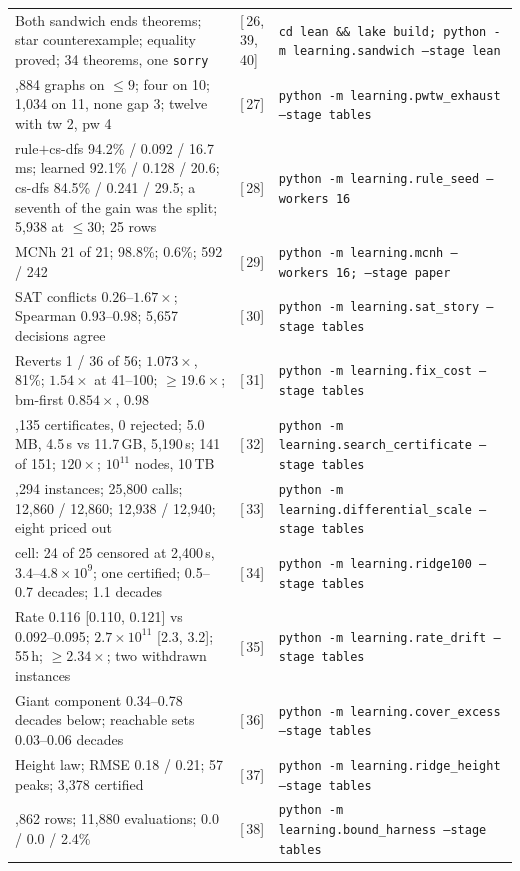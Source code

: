 \documentclass[11pt,a4paper]{article}
\renewcommand{\S}[1]{[\textsection\,#1]}
\newcommand{\code}[1]{\texttt{#1}}
\begin{document}
\begin{longtable}{>{\raggedright\arraybackslash}p{}l>{\raggedright\arraybackslash}p{}}
Both sandwich ends theorems; star counterexample; equality proved; 34 theorems, one \code{sorry} & \S{26, 39, 40} & \code{cd lean \&\& lake build; python -m learning.sandwich --stage lean} \\
287,884 graphs on $\le 9$; four on 10; 1,034 on 11, none gap 3; twelve with tw 2, pw 4 & \S{27} & \code{python -m learning.pwtw\_exhaust --stage tables} \\
rule$+$cs-dfs 94.2\% / 0.092 / 16.7\,ms; learned 92.1\% / 0.128 / 20.6; cs-dfs 84.5\% / 0.241 / 29.5; a seventh of the gain was the split; 5,938 at $\le 30$; 25 rows & \S{28} & \code{python -m learning.rule\_seed --workers 16} \\
MCNh 21 of 21; 98.8\%; 0.6\%; 592 / 242 & \S{29} & \code{python -m learning.mcnh --workers 16; --stage paper} \\
SAT conflicts $0.26$--$1.67\times$; Spearman 0.93--0.98; 5,657 decisions agree & \S{30} & \code{python -m learning.sat\_story --stage tables} \\
Reverts 1 / 36 of 56; $1.073\times$, 81\%; $1.54\times$ at 41--100; $\ge 19.6\times$; bm-first $0.854\times$, 0.98 & \S{31} & \code{python -m learning.fix\_cost --stage tables} \\
6,135 certificates, 0 rejected; 5.0\,MB, 4.5\,s vs 11.7\,GB, 5,190\,s; 141 of 151; $120\times$; $10^{11}$ nodes, 10\,TB & \S{32} & \code{python -m learning.search\_certificate --stage tables} \\
1,294 instances; 25,800 calls; 12,860 / 12,860; 12,938 / 12,940; eight priced out & \S{33} & \code{python -m learning.differential\_scale --stage tables} \\
100 cell: 24 of 25 censored at 2,400\,s, $3.4$--$4.8 \times 10^9$; one certified; 0.5--0.7 decades; 1.1 decades & \S{34} & \code{python -m learning.ridge100 --stage tables} \\
Rate 0.116 [0.110, 0.121] vs 0.092--0.095; $2.7 \times 10^{11}$ [2.3, 3.2]; 55\,h; $\ge 2.34\times$; two withdrawn instances & \S{35} & \code{python -m learning.rate\_drift --stage tables} \\
Giant component 0.34--0.78 decades below; reachable sets 0.03--0.06 decades & \S{36} & \code{python -m learning.cover\_excess --stage tables} \\
Height law; RMSE 0.18 / 0.21; 57 peaks; 3,378 certified & \S{37} & \code{python -m learning.ridge\_height --stage tables} \\
49,862 rows; 11,880 evaluations; 0.0 / 0.0 / 2.4\% & \S{38} & \code{python -m learning.bound\_harness --stage tables} \\
\end{longtable}
\normalsize
\end{document}
